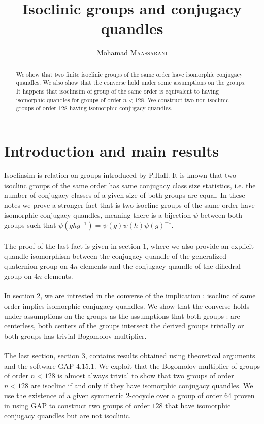 \documentclass[12pt, reqno]{amsart}
\begin{document}
 
\title{Isoclinic groups and conjugacy quandles}


 


 
\author{Mohamad \textsc{Maassarani} }
\maketitle
\begin{abstract} We show that two finite isoclinic groups of the same order have isomorphic conjugacy quandles. We also show that the converse hold under some assumptions on the groups. It happens that isoclinsim of group of the same order is equivalent to having isomorphic quandles for groups of order $n<128$. We construct two non isoclinic groups of order $128$ having isomorphic conjugacy quandles. \end{abstract}
 \section*{Introduction and main results}
Isoclinsim is relation on groups introduced by P.Hall. It is known that two isoclinc groups of the same order has same conjugacy class size statistics, i.e. the number of conjugacy classes of a given size of both groups are equal. In these notes we prove a stronger fact that is two isoclinc groups of the same order have isomorphic conjugacy quandles, meaning there is a bijection $\psi$ between both groups such that $\psi(ghg^{-1})=\psi(g)\psi(h)\psi(g)^{-1}$.\\\\
The proof of the last fact is given in section $1$, where we also provide an explicit quandle isomorphism between the conjugacy quandle of the generalized quaternion group on $4n$ elements and the conjugacy quandle of the dihedral group on $4n$ elements.\\\\
In section $2$, we are intrested in the converse of the implication : isoclinc of same order implies isomorphic conjugacy quandles. We show that the converse holds under assumptions on the groups as the assumptions that both groups : are centerless, both centers of the groups intersect the derived groups trivially or both groups has trivial Bogomolov multiplier.\\\\
The last section, section $3$, contains results obtained using theoretical arguments and the software GAP 4.15.1. We exploit that the Bogomolov multiplier of groups of order $n<128$ is almost always trivial to show that two groups of order $n<128$ are isoclinc if and only if they have isomorphic conjugacy quandles. We use the existence of a given symmetric $2$-cocycle over a group of order $64$ proven in \cite{MMb} using GAP to construct two groups of order $128$ that have isomorphic conjugacy quandles but are not isoclinic. 
\end{document}
